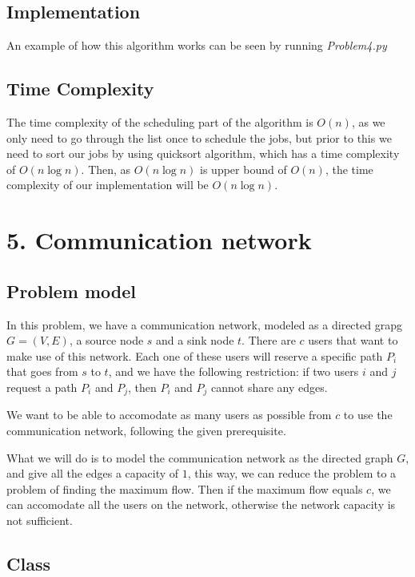 \documentclass{article}
\begin{document}
\subsection*{Implementation}

An example of how this algorithm works can be seen by running \textit{Problem4.py}

\subsection*{Time Complexity}

The time complexity of the scheduling part of the algorithm is $O(n)$, as we only need to go through the list once to schedule the jobs, but prior to this we need to sort our jobs by using quicksort algorithm, which has a time complexity of $O(n\log n)$. Then, as $O(n\log n)$ is upper bound of $O(n)$, the time complexity of our implementation will be $O(n\log n)$.

\section*{5. Communication network}

\subsection*{Problem model}

In this problem, we have a communication network, modeled as a directed grapg $G = (V,E)$, a source node $s$ and a sink node $t$. There are $c$ users that want to make use of this network. Each one of these users will reserve a specific path $P_i$ that goes from $s$ to $t$, and we have the following restriction: if two users $i$ and $j$ request a path $P_i$ and $P_j$, then $P_i$ and $P_j$ cannot share any edges.

We want to be able to accomodate as many users as possible from $c$ to use the communication network, following the given prerequisite. 

What we will do is to model the communication network as the directed graph $G$, and give all the edges a capacity of $1$, this way, we can reduce the problem to a problem of finding the maximum flow. Then if the maximum flow equals $c$, we can accomodate all the users on the network, otherwise the network capacity is not sufficient.

\subsection*{Class}
\end{document}
